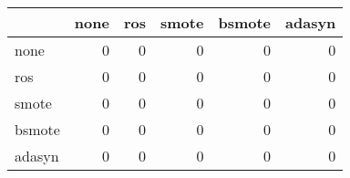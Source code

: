 \begin{tabular}{lrrrrr}
\hline
        &   none &   ros &   smote &   bsmote &   adasyn \\
\hline
 none   &      0 &     0 &       0 &        0 &        0 \\
 ros    &      0 &     0 &       0 &        0 &        0 \\
 smote  &      0 &     0 &       0 &        0 &        0 \\
 bsmote &      0 &     0 &       0 &        0 &        0 \\
 adasyn &      0 &     0 &       0 &        0 &        0 \\
\hline
\end{tabular}